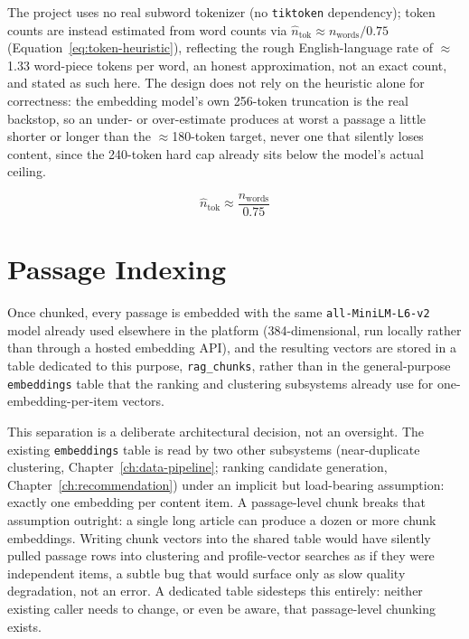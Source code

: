 The project uses no real subword tokenizer (no \texttt{tiktoken} dependency); token counts are instead estimated from word counts via $\hat{n}_{\text{tok}} \approx n_{\text{words}} / 0.75$ (Equation~\ref{eq:token-heuristic}), reflecting the rough English-language rate of $\approx$1.33 word-piece tokens per word, an honest approximation, not an exact count, and stated as such here. The design does not rely on the heuristic alone for correctness: the embedding model's own 256-token truncation is the real backstop, so an under- or over-estimate produces at worst a passage a little shorter or longer than the $\approx$180-token target, never one that silently loses content, since the 240-token hard cap already sits below the model's actual ceiling.

\begin{equation}
  \hat{n}_{\text{tok}} \approx \frac{n_{\text{words}}}{0.75}
  \label{eq:token-heuristic}
\end{equation}

\section{Passage Indexing}
\label{sec:rag-indexing}

Once chunked, every passage is embedded with the same \texttt{all-MiniLM-L6-v2} model already used elsewhere in the platform (384-dimensional, run locally rather than through a hosted embedding API), and the resulting vectors are stored in a table dedicated to this purpose, \texttt{rag\_chunks}, rather than in the general-purpose \texttt{embeddings} table that the ranking and clustering subsystems already use for one-embedding-per-item vectors.

This separation is a deliberate architectural decision, not an oversight. The existing \texttt{embeddings} table is read by two other subsystems (near-duplicate clustering, Chapter~\ref{ch:data-pipeline}; ranking candidate generation, Chapter~\ref{ch:recommendation}) under an implicit but load-bearing assumption: exactly one embedding per content item. A passage-level chunk breaks that assumption outright: a single long article can produce a dozen or more chunk embeddings. Writing chunk vectors into the shared table would have silently pulled passage rows into clustering and profile-vector searches as if they were independent items, a subtle bug that would surface only as slow quality degradation, not an error. A dedicated table sidesteps this entirely: neither existing caller needs to change, or even be aware, that passage-level chunking exists.

